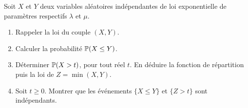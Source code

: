 \begin{td-exo}[] %
    Soit \(X\) et \(Y\) deux variables aléatoires indépendantes
    de loi exponentielle de paramètres respectifs \(\lambda\)
    et \(\mu\). 
    \begin{enumerate}
        \item Rappeler la loi du couple \((X,Y)\).

        \item Calculer la probabilité \(\mathbb{P}(X\leq Y)\).

        \item Déterminer \(\mathbb{P}(X>t)\), pour tout réel \(t\).
        En déduire la fonction de répartition puis la loi
        de \(Z = \min(X,Y)\).

        \item Soit \(t\geq 0\). Montrer que les
        événements \(\{X\leq Y\}\) et \(\{Z>t\}\) sont indépendants.
    \end{enumerate}
\end{td-exo}
